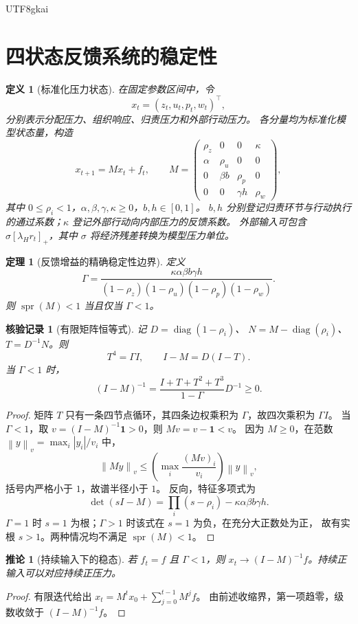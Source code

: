 \documentclass[12pt,a4paper,openany]{report}
\newtheorem{definition}{定义}[chapter]
\newtheorem{theorem}{定理}[chapter]
\newtheorem{corollary}{推论}[chapter]
\newtheorem{Certificate}{核验记录}[chapter]
\numberwithin{equation}{chapter}
\newcommand{\spr}{\operatorname{spr}}
\newcommand{\Norm}[1]{\left\lVert#1\right\rVert}
\begin{document}
\begin{CJK*}{UTF8}{gkai}
\section{四状态反馈系统的稳定性}

\begin{definition}[标准化压力状态]
在固定参数区间中，令
\[
 x_t=(z_t,u_t,p_t,w_t)^\top,
\]
分别表示分配压力、组织响应、归责压力和外部行动压力。
各分量均为标准化模型状态量，构造
\[
 x_{t+1}=Mx_t+f_t,\qquad
 M=
 \begin{pmatrix}
 \rho_z&0&0&\kappa\\
 \alpha&\rho_u&0&0\\
 0&\beta b&\rho_p&0\\
 0&0&\gamma h&\rho_w
 \end{pmatrix},
\]
其中 $0\le\rho_i<1$，$\alpha,\beta,\gamma,\kappa\ge0$，$b,h\in[0,1]$。
$b,h$ 分别登记归责环节与行动执行的通过系数；$\kappa$ 登记外部行动向内部压力的反馈系数。
外部输入可包含 $\sigma[\lambda_Hr_t]_+$，其中 $\sigma$ 将经济残差转换为模型压力单位。
\end{definition}

\begin{theorem}[反馈增益的精确稳定性边界]
\label{thm:feedback}
定义
\[
 \Gamma=
 \frac{\kappa\alpha\beta b\gamma h}
 {(1-\rho_z)(1-\rho_u)(1-\rho_p)(1-\rho_w)}.
\]
则 $\spr(M)<1$ 当且仅当 $\Gamma<1$。
\end{theorem}
\begin{Certificate}[有限矩阵恒等式]
记 $D=\operatorname{diag}(1-\rho_i)$、
$N=M-\operatorname{diag}(\rho_i)$、$T=D^{-1}N$。则
\[
 T^4=\Gamma I,\qquad
 I-M=D(I-T).
\]
当 $\Gamma<1$ 时，
\[
 (I-M)^{-1}=\frac{I+T+T^2+T^3}{1-\Gamma}D^{-1}\ge0.
\]
\end{Certificate}
\begin{proof}
矩阵 $T$ 只有一条四节点循环，其四条边权乘积为 $\Gamma$，故四次乘积为 $\Gamma I$。
当 $\Gamma<1$，取 $v=(I-M)^{-1}\mathbf1>0$，则 $Mv=v-\mathbf1<v$。
因为 $M\ge0$，在范数 $\Norm y_v=\max_i|y_i|/v_i$ 中，
\[
 \Norm{My}_v\le
 \left(\max_i\frac{(Mv)_i}{v_i}\right)\Norm y_v,
\]
括号内严格小于 $1$，故谱半径小于 $1$。
反向，特征多项式为
\[
 \det(sI-M)=\prod_i(s-\rho_i)-\kappa\alpha\beta b\gamma h.
\]
$\Gamma=1$ 时 $s=1$ 为根；$\Gamma>1$ 时该式在 $s=1$ 为负，在充分大正数处为正，
故有实根 $s>1$。两种情况均不满足 $\spr(M)<1$。
\end{proof}

\begin{corollary}[持续输入下的稳态]
若 $f_t=f$ 且 $\Gamma<1$，则
$x_t\to(I-M)^{-1}f$。持续正输入可以对应持续正压力。
\end{corollary}
\begin{proof}
有限迭代给出 $x_t=M^tx_0+\sum_{j=0}^{t-1}M^jf$。
由前述收缩界，第一项趋零，级数收敛于 $(I-M)^{-1}f$。
\end{proof}


\end{CJK*}
\end{document}
